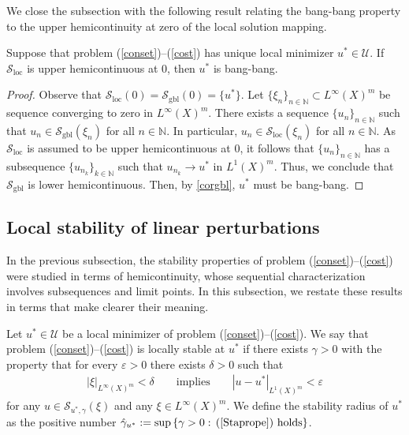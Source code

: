\documentclass[hidelinks,onefignum,onetabnum]{siamart220329}
\begin{document}
We close the subsection with the following result relating the bang-bang property to the upper hemicontinuity at zero of the local solution mapping.

\begin{corollary}
	Suppose that problem (\ref{conset})--(\ref{cost}) has unique local minimizer $u^*\in\mathcal U$. If $\mathcal S_{\text{loc}}$ is upper hemicontinuous at $0$, then $u^*$ is bang-bang.
\end{corollary}
\begin{proof}
	Observe that $\mathcal S_{\text{loc}}(0)=\mathcal S_{\text{gbl}}(0)=\{u^*\}$.
	Let $\{\xi_n\}_{n\in\mathbb N }\subset L^\infty(X)^m$ be sequence converging to zero in $L^\infty(X)^m$. There exists a sequence $\{u_{n}\}_{n\in\mathbb N}$  such that $u_n\in\mathcal S_{\text{gbl}}(\xi_n)$ for all $n\in\mathbb N$.  In particular, $u_n\in\mathcal S_{\text{loc}}(\xi_n)$ for all $n\in\mathbb N$. As $\mathcal S_{\text{loc}}$ is assumed to be upper hemicontinuous at $0$, it follows that $\{u_n\}_{n\in\mathbb N}$ has a subsequence $\{u_{n_{k}}\}_{k\in\mathbb N}$ such that $u_{n_k}\to u^*$ in $L^1(X)^m$. Thus, we conclude that $\mathcal S_{\text{gbl}}$ is lower hemicontinuous. Then, by \cref{corgbl}, $u^*$ must be  bang-bang.
\end{proof}



\subsection{Local stability of linear perturbations}

In the previous subsection, the stability properties of problem (\ref{conset})--(\ref{cost}) were studied in terms of hemicontinuity, whose sequential characterization involves subsequences and limit points.
In this subsection, we restate these results in  terms that make clearer their meaning.




\begin{definition}\label{locdef}
Let $u^*\in\mathcal U$ be a local minimizer of problem (\ref{conset})--(\ref{cost}). We say that problem (\ref{conset})--(\ref{cost}) is locally stable at $u^*$ if there exists $\gamma>0$ with the property that for every $\varepsilon>0$ there exists $\delta>0$ such that 
\begin{align}\label{Staprope}
	|\xi|_{{L^\infty(X)^m}}<\delta \qquad\text{implies}\qquad |u-u^*|_{{L^1(X)^m}}<\varepsilon
\end{align}
for any $u\in\mathcal S_{u^*,\gamma}(\xi)$ and any $\xi\in L^\infty(X)^m$.
We define the stability radius of $u^*$ as the positive number $\hat\gamma_{u^*}:=\sup\left\lbrace\gamma>0:\,\text{(\ref{Staprope}) holds}\right\rbrace$.
\end{definition}
\end{document}
